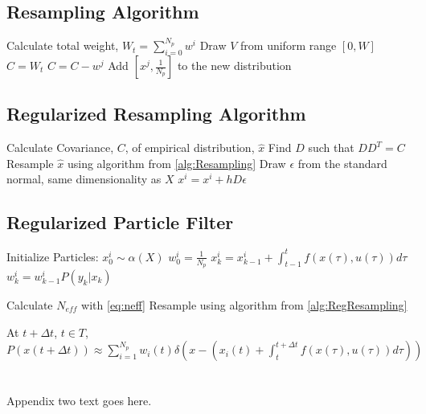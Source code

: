 \documentclass[journal]{./IEEEtran}
\begin{document}
\subsection{Resampling Algorithm}
\label{alg:RegResampling}
\begin{algorithm}
\begin{algorithmic}
\STATE Calculate total weight, $W_t = \sum_{i=0}^{N_p} w^i$
    \STATE Draw $V$ from uniform range $[0, W]$
    \STATE $C = W_t$
        \STATE $C = C - w^j$
    \ENDFOR
    \STATE Add $[x^j, \frac{1}{N_p}]$ to the new distribution
\ENDFOR
\STATE 
\end{algorithmic}
\label{alg:Resampling}
\end{algorithm}

\subsection{Regularized Resampling Algorithm}
\label{alg:RegResampler}
\begin{algorithm}
\begin{algorithmic}
\STATE Calculate Covariance, $C$, of empirical distribution, $\hat{x}$
\STATE Find $D$ such that $DD^T = C$
\STATE Resample $\hat{x}$ using algorithm from \autoref{alg:Resampling}
    \STATE Draw $\epsilon$ from the standard normal, same dimensionality as $X$
    \STATE $x^i = x^i + hD\epsilon$
\ENDFOR
\end{algorithmic}
\end{algorithm}

\subsection{Regularized Particle Filter}
\label{alg:RegularizedParticleFilter}
\begin{algorithm}
\begin{algorithmic}
\STATE Initialize Particles:
    \STATE $x^i_0  \sim \alpha(X)$
    \STATE $w^i_0 = \frac{1}{N_p}$
\ENDFOR
{}
        \STATE $x^i_k = x^i_{k-1} + \int_{t-1}^t f(x(\tau), u(\tau)) d\tau $
        \STATE $w^i_k = w^i_{k-1}P(y_k | x_k)$
    \ENDFOR

    \STATE Calculate $N_{eff}$ with \autoref{eq:neff}
        \STATE Resample using algorithm from \autoref{alg:RegResampling}
    \ENDIF
\ENDFOR

\STATE At $t + \Delta t$, $t \in T$, $P(x(t+\Delta t)) \approx 
\sum_{i=1}^{N_p} w_i(t)\delta\left(x - (x_i(t) + \int_t^{t+\Delta t} f(x(\tau), u(\tau)) d\tau) \right)$
 \end{algorithmic}
 \end{algorithm}

\section{}
Appendix two text goes here.





\end{document}

